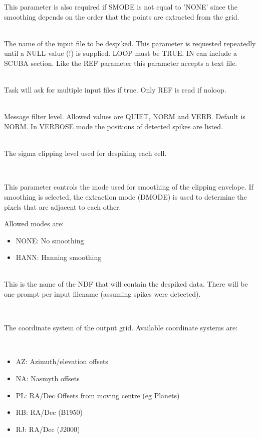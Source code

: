 \documentclass[twoside,11pt]{article}
\newcommand{\htmlref}[2]{#1}
\renewcommand{\_}{\texttt{\symbol{95}}}
\newcommand{\sstsubsection}[1]{ \item[{#1}] \mbox{} \\}
\newcommand{\sstitemlist}[1]{
  \mbox{} \\
  \vspace{-3.5ex}
  \begin{itemize}
     #1
  \end{itemize}
}
\newcommand{\sstitem}{\item}
\newcommand{\sstsubsection}[1]{\item[{#1}]}
\newcommand{\sstitemlist}[1]{
      \begin{itemize}
         #1
      \end{itemize}
      \\
   }
\newcommand{\sstitem}{\item}
\begin{document}
{{{        This parameter is also required if SMODE is not equal to
	'NONE' since the smoothing depends on the order that the points
	are extracted from the grid.
      }
      \sstsubsection{
         IN = CHAR (Read)
      }{
         The name of the input file to be despiked. This parameter is requested
         repeatedly until a NULL value (!) is supplied. LOOP must be TRUE.
         IN can include a \htmlref{SCUBA section}{sections}.
         Like the REF parameter this parameter accepts a text file.
      }
      \sstsubsection{
         LOOP = LOGICAL (Read)
      }{
         Task will ask for multiple input files if true. Only REF is read
         if noloop.
      }
      \sstsubsection{
         MSG\_FILTER = CHAR (Read)
      }{
         Message filter level. Allowed values are QUIET, NORM and VERB.
         Default is NORM. In VERBOSE mode the positions 
	 of detected spikes are listed.
      }
      \sstsubsection{
	 NSIGMA = REAL (Read)
      }{
         The sigma clipping level used for despiking each cell.
      }
      \sstsubsection{
	 SMODE = CHAR (Given)
      }{
 	This parameter controls the mode used for smoothing of the clipping
	envelope. If smoothing is selected, the extraction mode (DMODE) is used
	to determine the pixels that are adjacent to each other.

        Allowed modes are:

        \begin{itemize}
         \item NONE:  No smoothing
         \item HANN: Hanning smoothing 
        \end{itemize}
      }
      \sstsubsection{
         OUT = NDF (Write)
      }{
         This is the name of the NDF that will contain the despiked
         data. There will be one prompt per input filename (assuming spikes
         were detected). 
      }
      \sstsubsection{
         OUT\_COORDS = CHAR (Read)
      }{
         The coordinate system of the output grid. Available coordinate
         systems are:
         \sstitemlist{

            \sstitem
            AZ:  Azimuth/elevation offsets

            \sstitem
            NA:  Nasmyth offsets

            \sstitem
            PL:  RA/Dec Offsets from moving centre (eg Planets)

            \sstitem
            RB:  RA/Dec (B1950)

            \sstitem
            RJ:  RA/Dec (J2000)

}}}}
\end{document}
